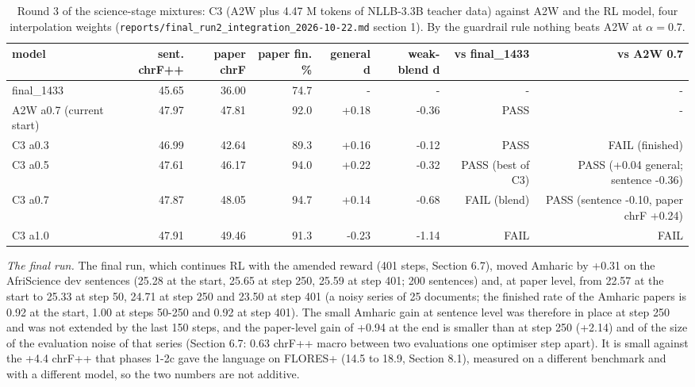 \begin{table}[t]
\centering
\footnotesize
\setlength{\tabcolsep}{3pt}
\caption{Round 3 of the science-stage mixtures: C3 (A2W plus 4.47 M tokens of NLLB-3.3B teacher data) against A2W and the RL model, four interpolation weights (\texttt{reports/final\_run2\_integration\_2026-10-22.md} section 1). By the guardrail rule nothing beats A2W at \(\alpha=0.7\).}
\label{tab:t_sft_stage_c3}
\begin{adjustbox}{max width=\linewidth}
{\def\LTcaptype{none} %
\begin{tabular}{@{}lrrrrrrr@{}}
\toprule
model & sent. chrF++ & paper chrF & paper fin. \% & general d & weak-blend d & vs final\_1433 & vs A2W 0.7 \\
\midrule
final\_1433 & 45.65 & 36.00 & 74.7 & - & - & - & - \\
A2W a0.7 (current start) & 47.97 & 47.81 & 92.0 & +0.18 & -0.36 & PASS & - \\
C3 a0.3 & 46.99 & 42.64 & 89.3 & +0.16 & -0.12 & PASS & FAIL (finished) \\
C3 a0.5 & 47.61 & 46.17 & 94.0 & +0.22 & -0.32 & PASS (best of C3) & PASS (+0.04 general; sentence -0.36) \\
C3 a0.7 & 47.87 & 48.05 & 94.7 & +0.14 & -0.68 & FAIL (blend) & PASS (sentence -0.10, paper chrF +0.24) \\
C3 a1.0 & 47.91 & 49.46 & 91.3 & -0.23 & -1.14 & FAIL & FAIL \\
\bottomrule
\end{tabular}
}
\end{adjustbox}
\end{table}

\emph{The final run.} The final run, which continues RL with the amended reward (401 steps, Section 6.7), moved Amharic by +0.31 on the AfriScience dev sentences (25.28 at the start, 25.65 at step 250, 25.59 at step 401; 200 sentences) and, at paper level, from 22.57 at the start to 25.33 at step 50, 24.71 at step 250 and 23.50 at step 401 (a noisy series of 25 documents; the finished rate of the Amharic papers is 0.92 at the start, 1.00 at steps 50-250 and 0.92 at step 401). The small Amharic gain at sentence level was therefore in place at step 250 and was not extended by the last 150 steps, and the paper-level gain of +0.94 at the end is smaller than at step 250 (+2.14) and of the size of the evaluation noise of that series (Section 6.7: 0.63 chrF++ macro between two evaluations one optimiser step apart). It is small against the +4.4 chrF++ that phases 1-2c gave the language on FLORES+ (14.5 to 18.9, Section 8.1), measured on a different benchmark and with a different model, so the two numbers are not additive.


